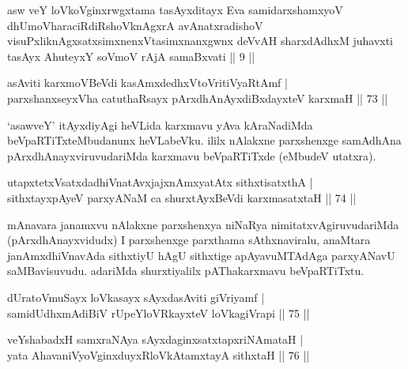 \begin{shl}
asw veY loVkoV\s ginxrwgxtama tasAyxditayx Eva samidarxshamxyoV dhUmoV\s haraciRdiRshoV\s knAgxrA avAnatxradishoV visuPxliknAgxsatxsimxnenxVtasimxnanxgwnx deVvAH sharxdAdhxM juhavxti tasAyx AhuteyxY soVmoV rAjA samaBxvati || 9 ||
\end{shl}


\begin{shl}
asAviti karxmoV\s BeVdi kasAmxdedhxVtoVritiVyaRtAmf | \\
parxshanxseyxVha catuthaRsayx pArxdhAnAyxdiBxdayxteV karxmaH \hfill|| 73 || 
\end{shl}

\begin{artha}
`asawveY' itAyxdiyAgi heVLida karxmavu yAva kAraNadiMda beVpaRTiTxteMbudanunx heVLabeVku. ililx nAlakxne parxshenxge samAdhAna pArxdhAnayxviruvudariMda karxmavu beVpaRTiTxde (eMbudeV utatxra).
\end{artha}


\begin{shl}
utapxtetxVsatxdadhiVnatAvxjajxnAmxyatAtx sithxtisatxthA | \\
sithxtayxpAyeV parxyANaM ca shurxtAyx\s BeVdi karxmasatxtaH \hfill|| 74 || 
\end{shl}

\begin{artha}
mAnavara janamxvu nAlakxne parxshenxya niNaRya nimitatxvAgiruvudariMda (pArxdhAnayxvidudx) I parxshenxge parxthama sAthxnaviralu, anaMtara janAmxdhiVnavAda sithxtiyU hAgU sithxtige apAyavuMTAdAga parxyANavU saMBavisuvudu. adariMda shurxtiyalilx pAThakarxmavu beVpaRTiTxtu.
\end{artha}


\begin{shl}
dUratoV\s muSayx loVkasayx sAyxdasAviti giVriyamf | \\
samidUdhxmAdiBiV rUpeYloVRkayxteV loVkagiVrapi \hfill|| 75 || 
\end{shl}

\begin{shl}
veYshabadxH samxraNAya sAyxdaginxsatxtapxriNAmataH | \\
yata AhavaniVyoV\s ginxduyxRloVkAtamxtayA sithxtaH \hfill|| 76 || 
\end{shl}

